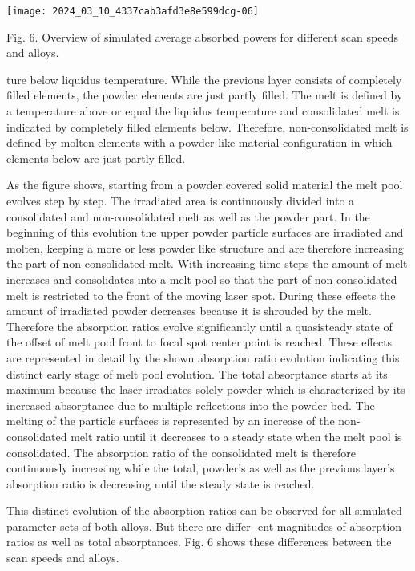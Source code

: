 \documentclass[10pt]{article}
\begin{document}
\begin{center}
\texttt{[image: 2024\_03\_10\_4337cab3afd3e8e599dcg-06]}
\end{center}

Fig. 6. Overview of simulated average absorbed powers for different scan speeds and alloys.

ture below liquidus temperature. While the previous layer consists of completely filled elements, the powder elements are just partly filled. The melt is defined by a temperature above or equal the liquidus temperature and consolidated melt is indicated by completely filled elements below. Therefore, non-consolidated melt is defined by molten elements with a powder like material configuration in which elements below are just partly filled.

As the figure shows, starting from a powder covered solid material the melt pool evolves step by step. The irradiated area is continuously divided into a consolidated and non-consolidated melt as well as the powder part. In the beginning of this evolution the upper powder particle surfaces are irradiated and molten, keeping a more or less powder like structure and are therefore increasing the part of non-consolidated melt. With increasing time steps the amount of melt increases and consolidates into a melt pool so that the part of non-consolidated melt is restricted to the front of the moving laser spot. During these effects the amount of irradiated powder decreases because it is shrouded by the melt. Therefore the absorption ratios evolve significantly until a quasisteady state of the offset of melt pool front to focal spot center point is reached. These effects are represented in detail by the shown absorption ratio evolution indicating this distinct early stage of melt pool evolution. The total absorptance starts at its maximum because the laser irradiates solely powder which is characterized by its increased absorptance due to multiple reflections into the powder bed. The melting of the particle surfaces is represented by an increase of the non-consolidated melt ratio until it decreases to a steady state when the melt pool is consolidated. The absorption ratio of the consolidated melt is therefore continuously increasing while the total, powder's as well as the previous layer's absorption ratio is decreasing until the steady state is reached.

This distinct evolution of the absorption ratios can be observed for all simulated parameter sets of both alloys. But there are differ- ent magnitudes of absorption ratios as well as total absorptances. Fig. 6 shows these differences between the scan speeds and alloys.
\end{document}
